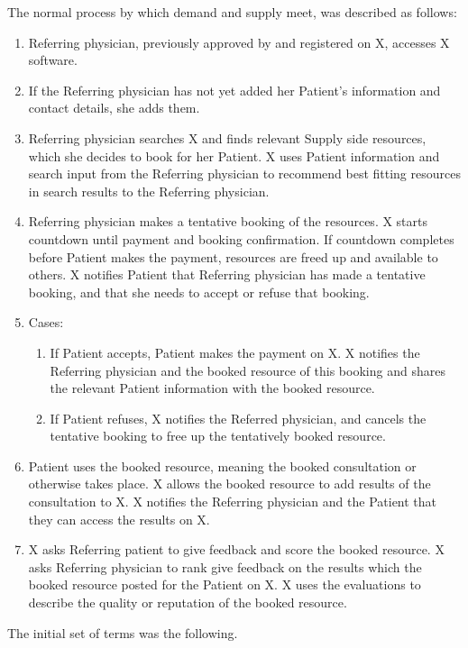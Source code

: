 \documentclass[graybox,envcountchap,sectrefs]{svmono}
\begin{document}
The normal process by which demand and supply meet, was described as follows:
\begin{enumerate}
	\item Referring physician, previously approved by and registered on X, accesses X software.
	\item If the Referring physician has not yet added her Patient’s information and contact details, she adds them. 
	\item Referring physician searches X and finds relevant Supply side resources, which she decides to book for her Patient. X uses Patient information and search input from the Referring physician to recommend best fitting resources in search results to the Referring physician.
	\item Referring physician makes a tentative booking of the resources. X starts countdown until payment and booking confirmation. If countdown completes before Patient makes the payment, resources are freed up and available to others.
X notifies Patient that Referring physician has made a tentative booking, and that she needs to accept or refuse that booking. 
	\item Cases:
		\begin{enumerate}
			\item If Patient accepts, Patient makes the payment on X. X notifies the Referring physician and the booked resource of this booking and shares the relevant Patient information with the booked resource.
			\item If Patient refuses, X notifies the Referred physician, and cancels the tentative booking to free up the tentatively booked resource.
		\end{enumerate}
	\item Patient uses the booked resource, meaning the booked consultation or otherwise takes place. X allows the booked resource to add results of the consultation to X. X notifies the Referring physician and the Patient that they can access the results on X.
	\item X asks Referring patient to give feedback and score the booked resource. X asks Referring physician to rank give feedback on the results which the booked resource posted for the Patient on X. X uses the evaluations to describe the quality or reputation of the booked resource.
\end{enumerate}

The initial set of terms was the following.
\end{document}

